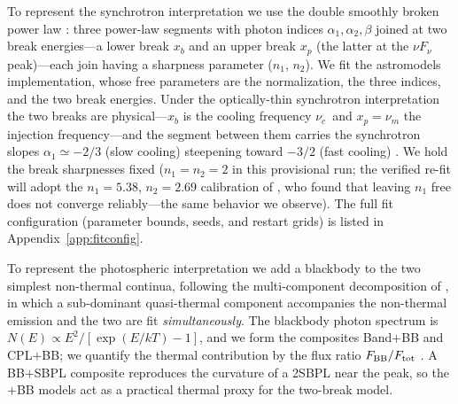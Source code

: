 \documentclass[twocolumn]{aastex631}
\newcommand{\nuc}{\ensuremath{\nu_c}}
\newcommand{\num}{\ensuremath{\nu_m}}
\newcommand{\kT}{\ensuremath{kT}}
\begin{document}
To represent the synchrotron interpretation we use the double smoothly broken
power law \citep[2SBPL;][whose Equations~1--4 give the functional
form]{Ravasio2018}: three power-law segments with photon indices
$\alpha_1,\alpha_2,\beta$ joined at two break energies---a lower break $x_b$
and an upper break $x_p$ (the latter at the $\nu F_\nu$ peak)---each join
having a sharpness parameter ($n_1$, $n_2$). We fit the
\textsf{astromodels} implementation, whose free parameters are the
normalization, the three indices, and the two break energies. Under the
optically-thin synchrotron interpretation the two breaks are
physical---$x_b$ is the cooling frequency \nuc\ and $x_p=\num$ the injection
frequency---and the segment between them carries the synchrotron slopes
$\alpha_1\simeq-2/3$ (slow cooling) steepening toward $-3/2$ (fast cooling)
\citep[e.g.,][]{Sari1998,Ravasio2019}. We hold the break sharpnesses fixed
($n_1=n_2=2$ in this provisional run; the verified re-fit will adopt the
$n_1=5.38$, $n_2=2.69$ calibration of \citealt{Ravasio2018}, who found that
leaving $n_1$ free does not converge reliably---the same behavior we observe).
The full fit configuration (parameter bounds, seeds, and restart grids) is
listed in Appendix~\ref{app:fitconfig}.

To represent the photospheric interpretation we add a blackbody to the two
simplest non-thermal continua, following the multi-component decomposition of
\citet{Guiriec2011,Guiriec2015}, in which a sub-dominant quasi-thermal component
accompanies the non-thermal emission and the two are fit \emph{simultaneously}.
The blackbody photon spectrum is $N(E)\propto E^{2}/[\exp(E/\kT)-1]$, and we form
the composites Band$+$BB and CPL$+$BB; we quantify the thermal contribution by the
flux ratio $F_{\rm BB}/F_{\rm tot}$ \citep{Guiriec2015}. A BB$+$SBPL composite
reproduces the curvature of a 2SBPL near the peak, so the $+$BB models act as a
practical thermal proxy for the two-break model.
\end{document}
